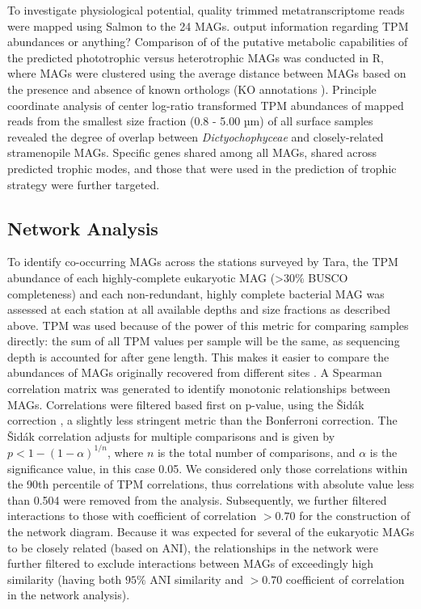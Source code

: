 \documentclass[12pt]{article}
\numberwithin{equation}{section}
\begin{document}
To investigate physiological potential, quality trimmed metatranscriptome reads were mapped using Salmon \cite{Patro2017Salmon} to the 24 MAGs. output information regarding TPM abundances or anything? Comparison of of the putative metabolic capabilities of the predicted phototrophic versus heterotrophic MAGs was conducted in R, where MAGs were clustered using the average distance between MAGs based on the presence and absence of known orthologs (KO annotations \citep{Kanehisa_2019}). Principle coordinate analysis of center log-ratio transformed TPM abundances of mapped reads from the smallest size fraction (0.8 - 5.00 µm) of all surface samples revealed the degree of overlap between \emph{Dictyochophyceae} and closely-related stramenopile MAGs. Specific genes shared among all MAGs, shared across predicted trophic modes, and those that were used in the prediction of trophic strategy \citep{} were further targeted.

\subsection*{Network Analysis} 

To identify co-occurring MAGs across the stations surveyed by Tara, the TPM abundance of each highly-complete eukaryotic MAG (>30\% BUSCO completeness) and each non-redundant, highly complete bacterial MAG was assessed at each station at all available depths and size fractions as described above. TPM was used because of the power of this metric for comparing samples directly: the sum of all TPM values per sample will be the same, as sequencing depth is accounted for after gene length. This makes it easier to compare the abundances of MAGs originally recovered from different sites \citep{Gradoville_2017}. A Spearman correlation matrix was generated to identify monotonic relationships between MAGs. Correlations were filtered based first on p-value, using the Šidák correction \citep{Sidak_1967}, a slightly less stringent metric than the Bonferroni correction. The Šidák correlation adjusts for multiple comparisons and is given by $p < 1-(1-\alpha)^{1/n}$, where $n$ is the total number of comparisons, and $\alpha$ is the significance value, in this case 0.05. We considered only those correlations within the 90th percentile of TPM correlations, thus correlations with absolute value less than 0.504 were removed from the analysis. Subsequently, we further filtered interactions to those with coefficient of correlation $>0.70$ for the construction of the network diagram. Because it was expected for several of the eukaryotic MAGs to be closely related (based on ANI), the relationships in the network were further filtered to exclude interactions between MAGs of exceedingly high similarity (having both $95\%$ ANI similarity and $>0.70$ coefficient of correlation in the network analysis). 
\end{document}
